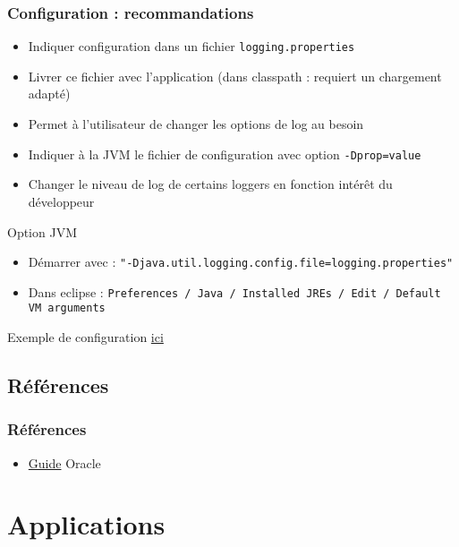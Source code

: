 \documentclass[english, french]{beamer}
\begin{document}
\begin{frame}[fragile]
	\frametitle{Configuration : recommandations}
	\begin{itemize}
		\item Indiquer configuration dans un fichier \texttt{logging.properties}
		\item Livrer ce fichier avec l’application {\tiny (dans classpath : requiert un chargement adapté)}
		\item Permet à l’utilisateur de changer les options de log au besoin
		\item Indiquer à la JVM le fichier de configuration avec option \texttt{-Dprop=value}
		\item Changer le niveau de log de certains loggers en fonction intérêt du développeur
	\end{itemize}
	\begin{block}{Option JVM}
		\begin{itemize}
			\item Démarrer avec : {\small\texttt{"-Djava.util.logging.config.file=logging.properties"}}
			\item Dans eclipse : \texttt{Preferences / Java / Installed JREs / Edit / Default VM arguments}\vspace{-1pt}
		\end{itemize}
	\end{block}
	Exemple de configuration \href{https://github.com/oliviercailloux/jee/blob/master/Sample/logging.properties}{ici}
\end{frame}

\subsection{Références}
\begin{frame}
	\frametitle{Références}
	\begin{itemize}
		\item \href{https://docs.oracle.com/javase/8/docs/technotes/guides/logging/overview.html}{Guide} Oracle
	\end{itemize}
\end{frame}

\section{Applications}
\end{document}
